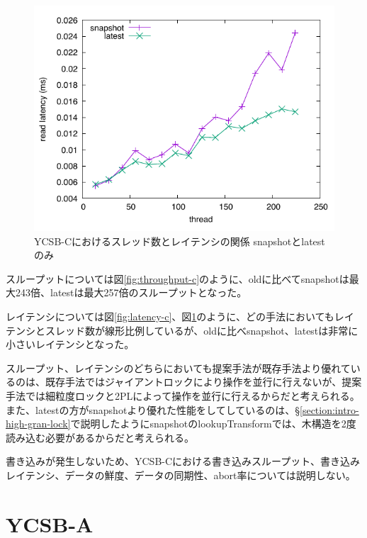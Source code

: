 \documentclass[a4paper]{jreport}	%
\begin{document}
\begin{figure}[h] 
\centering
\includegraphics[width=15cm]{ycsb-c/opposite-read-latency2}
\caption{YCSB-Cにおけるスレッド数とレイテンシの関係 snapshotとlatestのみ}
\label{fig:latency-c2}
\end{figure}

スループットについては図\ref{fig:throughput-c}のように、oldに比べてsnapshotは最大243倍、latestは最大257倍のスループットとなった。

レイテンシについては図\ref{fig:latency-c}、図\ref{fig:latency-c2}のように、どの手法においてもレイテンシとスレッド数が線形比例しているが、oldに比べsnapshot、latestは非常に小さいレイテンシとなった。

スループット、レイテンシのどちらにおいても提案手法が既存手法より優れているのは、既存手法ではジャイアントロックにより操作を並行に行えないが、提案手法では細粒度ロックと2PLによって操作を並行に行えるからだと考えられる。また、latestの方がsnapshotより優れた性能をしてしているのは、§\ref{section:intro-high-gran-lock}で説明したようにsnapshotのlookupTransformでは、木構造を2度読み込む必要があるからだと考えられる。

書き込みが発生しないため、YCSB-Cにおける書き込みスループット、書き込みレイテンシ、データの鮮度、データの同期性、abort率については説明しない。

\section{YCSB-A}
\label{section:ycsb-a}

\end{document}
